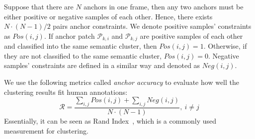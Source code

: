 \documentclass[letterpaper, 10 pt, conference]{ieeeconf}  %
\begin{document}
	Suppose that there are $N$ anchors in one frame, then any two anchors must be either positive or negative samples of each other. Hence, there exists $N \cdot(N-1)/2$ pairs anchor constraints.
	We denote positive samples' constraints as $Pos(i,j)$. If anchor patch $\mathcal{P}_{k,i}$ and $\mathcal{P}_{k,j}$ are positive samples of each other and classified into the same semantic cluster, then $Pos(i,j)=1$. Otherwise, if they are not classified to the same semantic cluster, $Pos(i,j)=0$.
	Negative samples' constraints are defined in a similar way and denoted as $Neg(i,j)$.
	
	We use the following metrics called \textit{anchor accuracy} to evaluate how well the clustering results fit human annotations:
	\begin{equation}
	\label{R}
	\mathcal{R}=\dfrac{\sum_{i,j}{Pos(i,j)}+\sum_{i,j}{Neg(i,j)}}{N\cdot (N-1)}, ~i \neq j
	\end{equation}
	Essentially, it can be seen as Rand Index~\cite{rand1971objective}, which is a commonly used measurement for clustering.
	
\end{document}
